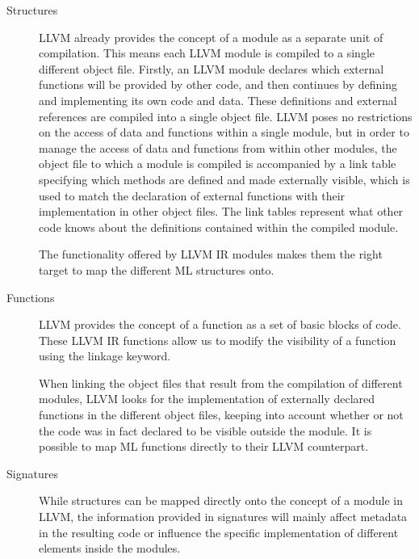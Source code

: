 \begin{description}
\item[Structures]
LLVM already provides the concept of a module as a separate unit of compilation. This means each LLVM module is compiled to a single different object file. Firstly, an LLVM module declares which external functions will be provided by other code, and then continues by defining and implementing its own code and data. These definitions and external references are compiled into a single object file. LLVM poses no restrictions on the access of data and functions within a single module, but in order to manage the access of data and functions from within other modules, the object file to which a module is compiled is accompanied by a link table specifying which methods are defined and made externally visible, which is used to match the declaration of external functions with their implementation in other object files. The link tables represent what other code knows about the definitions contained within the compiled module.



The functionality offered by LLVM IR modules makes them the right target  to map the different ML structures onto.

\item[Functions]
LLVM provides the concept of a function as a set of basic blocks of code. 
These LLVM IR functions allow us to modify the visibility of a function using the linkage keyword. 

When linking the object files that result from the compilation of different modules, LLVM looks for the implementation of externally declared functions in the different object files, keeping into account whether or not the code was in fact declared to be visible outside the module. It is possible to map ML functions directly to their LLVM counterpart.

\item[Signatures]
While structures can be mapped directly onto the concept of a module in LLVM, the information provided in signatures will mainly affect metadata in the resulting code or influence the specific implementation of different elements inside the modules.


\end{description}
